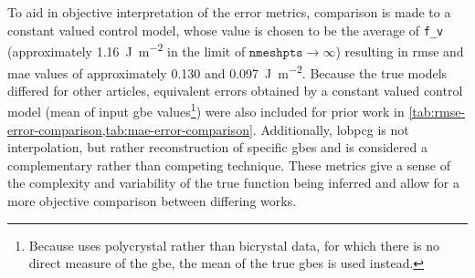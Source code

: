 \documentclass[final,twocolumn,12pt]{elsarticle}
\newcommand{\inpt}{input}
\newcommand{\inptvar}{nmeshpts}
\begin{document}

To aid in objective interpretation of the error metrics, comparison is made to a constant valued control model, whose value is chosen to be the average of \texttt{f\_v} (approximately \SI{1.16}{\J\per\square\meter} in the limit of $\texttt{\inptvar{}} \rightarrow \infty$) resulting in \gls{rmse} and \gls{mae} values of approximately \num{0.130} and \SI{0.097}{\J\per\square\meter}. Because the true models differed for other articles, equivalent errors obtained by a constant valued control model (mean of \inpt{} \gls{gbe} values\footnote{Because \cite{shenDeterminingGrainBoundary2019} uses polycrystal rather than bicrystal data, for which there is no direct measure of the \gls{gbe}, the mean of the true \glspl{gbe} is used instead.}) were also included for prior work in \cref{tab:rmse-error-comparison,tab:mae-error-comparison}. Additionally, \gls{lobpcg} is not interpolation, but rather reconstruction of specific \glspl{gbe} and is considered a complementary rather than competing technique. These metrics give a sense of the complexity and variability of the true function being inferred and allow for a more objective comparison between differing works.
\end{document}

